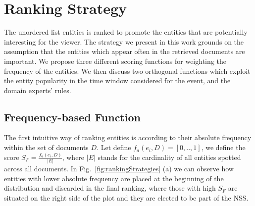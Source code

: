 \documentclass{llncs}
\begin{document}

\section{Ranking Strategy}
\label{sec:Ranking}
The unordered list entities is ranked to promote the entities that are potentially interesting for the viewer. The strategy we present in this work grounds on the assumption that the entities which appear often in the retrieved documents are important. We propose three different scoring functions for weighting the frequency of the entities. We then discuss two orthogonal functions which exploit the entity popularity in the time window considered for the event, and the domain experts' rules.

\subsection{Frequency-based Function}
The first intuitive way of ranking entities is according to their absolute frequency within the set of documents $D$. Let define $f_a(e_i, D)=[0,..,1]$, we define the score $S_F = \frac{ f_a(e_i, D) }{ |E| } $, where $|E|$ stands for the cardinality of all entities spotted across all documents. 
In Fig.~\ref{fig:rankingStrategies} (a) we can observe how entities with lower absolute frequency are placed at the beginning of the distribution and discarded in the final ranking, where those with high $S_F$ are situated on the right side of the plot and they are elected to be part of the NSS.
\end{document}
